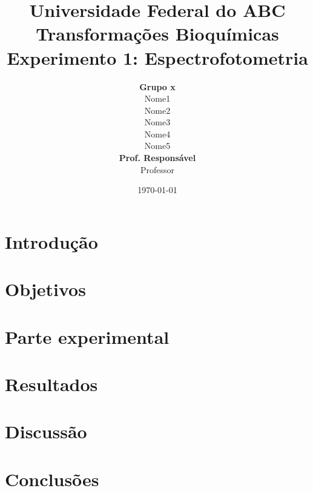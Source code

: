 \documentclass[a4paper, oneside]{report}                        %
\title{\Huge{Universidade Federal do ABC}\\[1.5cm]\huge{Transformações Bioquímicas}\\[2cm]\large{\textbf{Experimento 1: Espectrofotometria}}\\[4cm]}  %
\author{\hfill \textbf{Grupo x}\smallskip\\\hfill Nome1\\\hfill Nome2\\\hfill Nome3\\\hfill Nome4\\\hfill Nome5\medskip\\\hfill \textbf{Prof. Responsável}\smallskip\\\hfill Professor} %
\date{\vfill\today}                                           %
\begin{document}

\maketitle                                                      %
\tableofcontents                                                %

\renewcommand{\abstractname}{Abstract}                          %
\begin{abstract}                                                %
\end{abstract}                                                  %

\renewcommand{\abstractname}{Resumo}                            %
\begin{abstract}                                                %
\end{abstract}                                                  %

\chapter*{Introdução}                                           %

\chapter*{Objetivos}

\chapter*{Parte experimental}

\chapter*{Resultados}

\chapter*{Discussão}

\chapter*{Conclusões}


\end{document}
